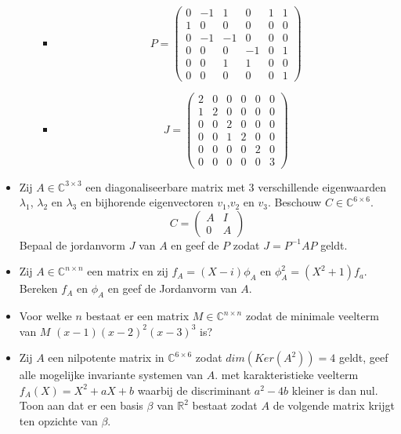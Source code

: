 \documentclass[main.tex]{subfiles}
\begin{document}
\begin{itemize}
\begin{itemize}
\begin{itemize}
    \item 
      \[ P = 
      \left(
        \begin{array}{ccccc|c}
          0 & -1 & 1 & 0 & 1 & 1\\
          1 & 0 & 0 & 0 & 0 & 0\\
          0 & -1 & -1 & 0 & 0 & 0\\
          0 & 0 & 0 & -1 & 0 & 1\\
          0 & 0 & 1 & 1 & 0 & 0 \\
          0 & 0 & 0 & 0 & 0 & 1
        \end{array}
      \right)
      \]
    \item 
      \[
      J = 
      \left(
        \begin{array}{ccccc|c}
          2 & 0 & 0 & 0 & 0 & 0\\
          1 & 2 & 0 & 0 & 0 & 0\\
          0 & 0 & 2 & 0 & 0 & 0\\
          0 & 0 & 1 & 2 & 0 & 0\\
          0 & 0 & 0 & 0 & 2 & 0\\\hline
          0 & 0 & 0 & 0 & 0 & 3
        \end{array}
      \right)
      \]
    \end{itemize}
  \end{itemize}
\item Zij $A\in \mathbb{C}^{3\times 3}$ een diagonaliseerbare matrix met $3$ verschillende eigenwaarden $\lambda_{1}$, $\lambda_{2}$ en $\lambda_{3}$ en bijhorende eigenvectoren $v_{1}$,$v_{2}$ en $v_{3}$.
  Beschouw $C \in \mathbb{C}^{6\times 6}$.
  \[ C =
  \begin{pmatrix}
    A & I \\
    0 & A
  \end{pmatrix}
  \]
  Bepaal de jordanvorm $J$ van $A$ en geef de $P$ zodat $J=P^{-1}AP$ geldt.
\item Zij $A\in \mathbb{C}^{n \times n}$ een matrix en zij $f_{A} = (X-i)\phi_{A}$ en $\phi_{A}^{2} = (X^{2}+1)f_{a}$.
  Bereken $f_{A}$ en $\phi_{A}$ en geef de Jordanvorm van $A$.
\item Voor welke $n$ bestaat er een matrix $M\in \mathbb{C}^{n\times n}$ zodat de minimale veelterm van $M$ $(x-1)(x-2)^{2}(x-3)^{3}$ is?
\item Zij $A$ een nilpotente matrix in $\mathbb{C}^{6\times 6}$ zodat $dim(Ker(A^{2}))=4$ geldt, geef alle mogelijke invariante systemen van $A$. met karakteristieke veelterm $f_{A}(X)=X^{2}+aX+b$ waarbij de discriminant $a^{2}-4b$ kleiner is dan nul.
  Toon aan dat er een basis $\beta$ van $\mathbb{R}^{2}$ bestaat zodat $A$ de volgende matrix krijgt ten opzichte van $\beta$.
\end{itemize}
\end{document}
